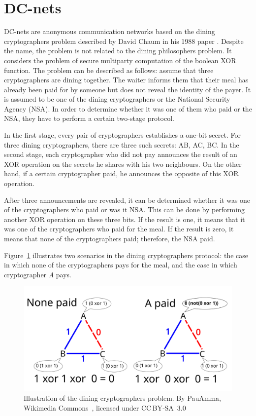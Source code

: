 \section{DC-nets}

DC-nets are anonymous communication networks based on the dining cryptographers problem described by David Chaum in his 1988 paper \cite{dc-nets}. Despite the name, the problem is not related to the dining philosophers problem. It considers the problem of secure multiparty computation of the boolean XOR function. 
The problem can be described as follows: assume that three cryptographers are dining together. The waiter informs them that their meal has already been paid for by someone but does not reveal the identity of the payer. It is assumed to be one of the dining cryptographers or the National Security Agency (NSA). In order to determine whether it was one of them who paid or the NSA, they have to perform a certain two-stage protocol.

In the first stage, every pair of cryptographers establishes a one-bit secret. For three dining cryptographers, there are three such secrets: AB, AC, BC.
In the second stage, each cryptographer who did not pay announces the result of an XOR operation on the secrets he shares with his two neighbours. On the other hand, if a certain cryptographer paid, he announces the opposite of this XOR operation.

After three announcements are revealed, it can be determined whether it was one of the cryptographers who paid or was it NSA. This can be done by performing another XOR operation on these three bits. If the result is one, it means that it was one of the cryptographers who paid for the meal. If the result is zero, it means that none of the cryptographers paid; therefore, the NSA paid.

Figure~\ref{fig:dining_cryptographers} illustrates two scenarios in the dining cryptographers protocol: the case in which none of the cryptographers pays for the meal, and the case in which cryptographer \textit{A} pays.

\begin{figure}[ht]
  \centering
  \includegraphics[width=0.7\linewidth]{Images/dc.png}
  \caption{Illustration of the dining cryptographers problem. By PauAmma, Wikimedia Commons~\cite{dining_cryptographers_pauamma}, licensed under CC BY‑SA 3.0}
  \label{fig:dining_cryptographers}
\end{figure}

